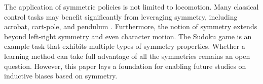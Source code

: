 The application of symmetric policies is not limited to locomotion.  
Many classical control tasks may benefit significantly from leveraging symmetry, 
including acrobat, cart-pole, and pendulum \citep{ref:OpenAI-Gym}.  
Furthermore, the notion of symmetry extends beyond left-right symmetry and even character motion.  
The Sudoku game is an example task that exhibits multiple types of symmetry properties. 
Whether a learning method can take full advantage of all the symmetries remains an open question.
However, this paper lays a foundation for enabling future studies on inductive biases
based on symmetry.